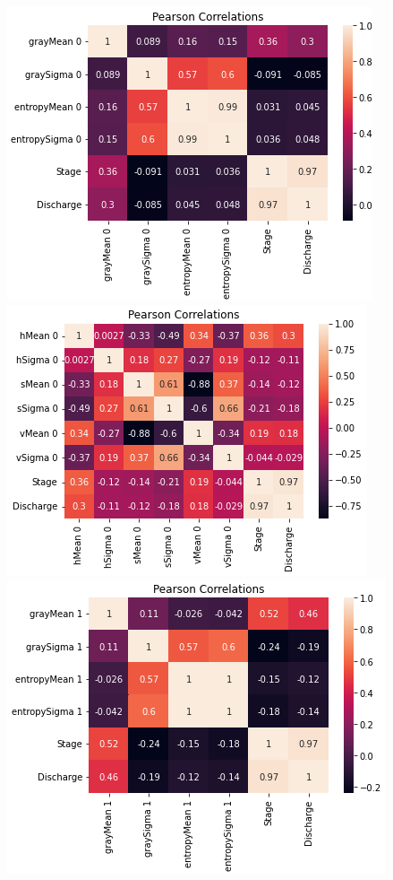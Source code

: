 \documentclass{article}
\begin{document}
\begin{center}
            \includegraphics{images/Corr_pearson5.PNG} 
            \includegraphics{images/Corr_pearson6.PNG} 
            \includegraphics{images/Corr_pearson7.PNG} 

\end{center}
\end{document}
